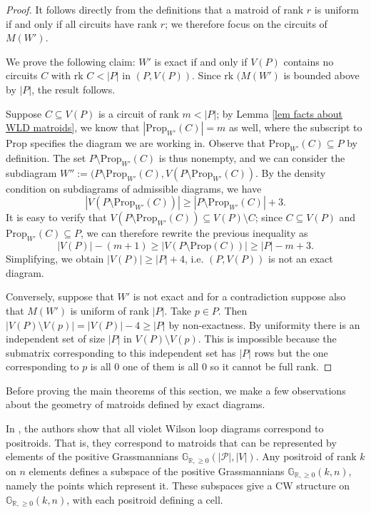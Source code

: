 \documentclass[11pt]{article}
\newcommand{\hlfix}[2]{\texthl{#1}\todo{#2}}
\newcommand{\R}{\mathbb{R}}
\newcommand{\Gr}{\mathbb{G}_{\R, \geq 0}}
\newcommand{\rk}{\textrm{rk }}
\newcommand{\cP}{\mathcal{P}}
\newcommand{\Prop}{\textrm{Prop}}
\theoremstyle{remark}
\theoremstyle{definition}
\begin{document}
\begin{proof}
It follows directly from the definitions that a matroid of rank $r$ is uniform if and only if all circuits have rank $r$; we therefore focus on the circuits of $M(W')$.

We prove the following claim: $W'$ is exact if and only if $V(P)$ contains no circuits $C$ with $\rk C< |P|$ in $(P, V(P))$. Since $\rk(M(W')$ is bounded above by $|P|$, the result follows.

Suppose $C \subseteq V(P)$ is a circuit of rank $m < |P|$; by Lemma \ref{lem facts about WLD matroids}, we know that $|\Prop_{W'}(C)| = m$ as well, where the subscript to $\Prop$ specifies the diagram we are working in.  Observe that $\Prop_{W'}(C)\subseteq P$ by definition. The set $P \setminus \Prop_{W'}(C)$ is thus nonempty, and we can consider the subdiagram $W'':= (P\setminus \Prop_{W'}(C),V(P\setminus\Prop_{W'}(C))$. By the density condition on subdiagrams of admissible diagrams, we have
\[|V(P\setminus\Prop_{W'}(C))| \geq |P\setminus\Prop_{W'}(C)| + 3.\]
It is easy to verify that $V(P\setminus\Prop_{W'}(C)) \subseteq V(P)\setminus C$; since $C \subseteq V(P)$ and $\Prop_{W'}(C) \subseteq P$, we can therefore rewrite the previous inequality as
\[|V(P)| - (m+1) \geq |V(P\setminus\Prop(C))| \geq |P| - m + 3.\]
Simplifying, we obtain $|V(P)| \geq |P| + 4$, i.e. $(P,V(P))$ is not an exact diagram.

Conversely, suppose that $W'$ is not exact and for a contradiction suppose also that $M(W')$ is uniform of rank $|P|$.  Take $p \in P$.  Then $|V(P)\setminus V(p)| = |V(P)| - 4 \geq |P|$ by non-exactness.  By uniformity there is an independent set of size $|P|$ in $V(P)\setminus V(p)$.  This is impossible because the submatrix corresponding to this independent set has $|P|$ rows but the one corresponding to $p$ is all $0$ one of them is all 0 so it cannot be full rank.
\end{proof}

Before proving the main theorems of this section, we make a few observations about the geometry of matroids defined by exact diagrams.

In \cite{wilsonloops}, the authors show that all violet Wilson loop diagrams correspond to positroids. That is, they correspond to matroids that can be represented by elements of the positive Grassmannians $\Gr(|\cP|, |V|)$. Any positroid of rank $k$ on $n$ elements defines a subspace of the positive Grassmannians $\Gr(k, n)$, namely the points which represent it. These subspaces give a CW structure on $\Gr(k,n)$, with each positroid defining a cell. 
\end{document}
